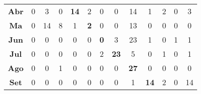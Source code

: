 \begin{table}[h]
\begin{tabular}{c|cccccccccccc}
\textbf{Abr} & 0                                & 3                                & \multicolumn{1}{c|}{0}           & \multicolumn{1}{c|}{\textbf{14}} & 2                               & 0                               & 0                                & 14                               & 1                                & 2                                & 0                               & 3                                \\ \cline{5-6}
\textbf{Ma}  & 0                                & 14                               & 8                                & \multicolumn{1}{c|}{1}           & \multicolumn{1}{c|}{\textbf{2}} & 0                               & 0                                & 13                               & 0                                & 0                                & 0                               & 0                                \\ \cline{6-7}
\textbf{Jun} & 0                                & 0                                & 0                                & 0                                & \multicolumn{1}{c|}{0}          & \multicolumn{1}{c|}{\textbf{0}} & 3                                & 23                               & 1                                & 0                                & 1                               & 1                                \\ \cline{7-8}
\textbf{Jul} & 0                                & 0                                & 0                                & 0                                & 0                               & \multicolumn{1}{c|}{2}          & \multicolumn{1}{c|}{\textbf{23}} & 5                                & 0                                & 1                                & 0                               & 1                                \\ \cline{8-9}
\textbf{Ago} & 0                                & 0                                & 1                                & 0                                & 0                               & 0                               & \multicolumn{1}{c|}{0}           & \multicolumn{1}{c|}{\textbf{27}} & 0                                & 0                                & 0                               & 0                                \\ \cline{9-10}
\textbf{Set} & 0                                & 0                                & 0                                & 0                                & 0                               & 0                               & 0                                & \multicolumn{1}{c|}{1}           & \multicolumn{1}{c|}{\textbf{14}} & 2                                & 0                               & 14                               \\ \cline{10-11}

\end{tabular}
\end{table}
